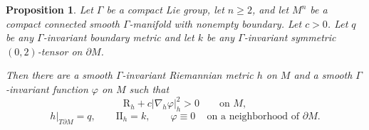 \documentclass[11pt]{amsart}
\numberwithin{equation}{section}
\newtheorem{proposition}[theorem]{Proposition}
\newcommand{\scal}{\mathrm{R}}
\let\geq\geqslant
\begin{document}
\begin{proposition}\label{thm:mainnew}
Let $\Gamma$ be a compact Lie group, let $n\geq 2$, and let $M^n$ be a
compact connected smooth $\Gamma$-manifold with nonempty boundary.  
Let $c>0$. Let $q$
be any $\Gamma$-invariant boundary metric and let $k$
be any $\Gamma$-invariant symmetric $(0,2)$-tensor on $\partial M$. 

Then there are a smooth
$\Gamma$-invariant Riemannian metric $h$ on $M$ and a smooth
$\Gamma$-invariant function $\varphi$ on $M$ such that
\begin{equation}\label{eq:strict-main}
  \scal_h+c|\nabla_h\varphi|_h^2>0\qquad\text{on }M,
\end{equation}
\begin{equation}\label{eq:boundary-data}
  h|_{T\partial M}=q,\qquad \mathrm{II}_h=k, \qquad 
 \varphi\equiv 0\,\quad \text{on a neighborhood of $\partial M$}.
\end{equation}
\end{proposition}
\end{document}
